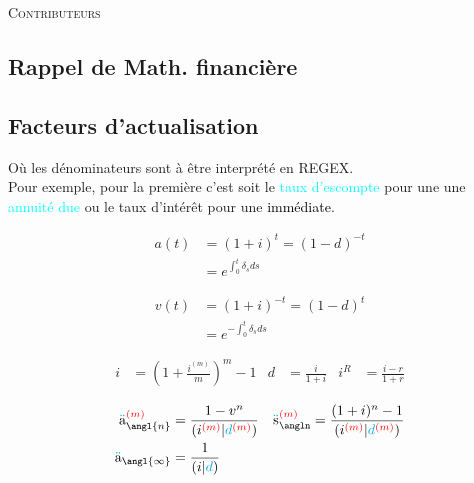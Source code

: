 \documentclass[10pt, french]{article}
\newcommand\cumlaut[2][black]{\stackon[.33ex]{#2}{\textcolor{#1}{\kern-.04ex.\kern-.2ex.}}}
\begin{document}
\begin{center}
	\textsc{\Large Contributeurs}\\[0.5cm] 
\end{center}


\newpage

\footnotesize %
\begin{multicols*}{3} 	%
\section*{Rappel de Math. financière}
\subsection*{Facteurs d'actualisation}
Où les dénominateurs sont à être interprété en REGEX.\\
Pour exemple, pour la première c’est soit le \textcolor{cyan}{taux d'escompte} pour une une \textcolor{cyan}{annuité due} ou le taux d'intérêt pour une \textcolor{black}{immédiate}.

\setlength{\mathindent}{-1cm}
\begin{minipage}{0.5\columnwidth}
\begin{align*}
	a(t) 
		&= 	(1 + i)^{t} 
		= 	(1 - d)^{-t}		\\
	&= 	e^{\int_{0}^{t} \delta_s ds} %
\end{align*}
\end{minipage}
\begin{minipage}{0.5\columnwidth}
\begin{align*}
	v(t) 
		&= 	(1 + i)^{-t} 
		= 	(1 - d)^{t}	 \\
	&= 	e^{-\int_{0}^{t} \delta_s ds} %
\end{align*}
\end{minipage}
\begin{align*}
	i 	&= \left( 1 + \frac{i^{(m)}}{m} \right)^{m} - 1 &
	d	&= 	\frac{i}{1 + i} &
	i^{R}
		&=	\frac{i - r}{1 + r}
\end{align*}

\begin{align*}
	\cumlaut[cyan]{a}_{\angl{n}}^{\textcolor{red}{(m)}} 
		&= \frac{1 - v^n}{ (i^{\textcolor{red}{(m)}}{\color{black}|}{\color{cyan}d}^{\textcolor{red}{(m)}}{\color{black})}}	&
	\cumlaut[cyan]{s}_{\angln}^{\textcolor{red}{(m)}} 
		&=	\frac{(1+i)^{n} - 1}{(i^{\textcolor{red}{(m)}} | \textcolor{cyan}{d}^{\textcolor{red}{(m)}})}	\\
	\cumlaut[cyan]{a}_{\angl{\infty}} 
		&= \frac{1}{(i|\textcolor{cyan}{d})}
\end{align*}


\end{multicols*}
\end{document}
